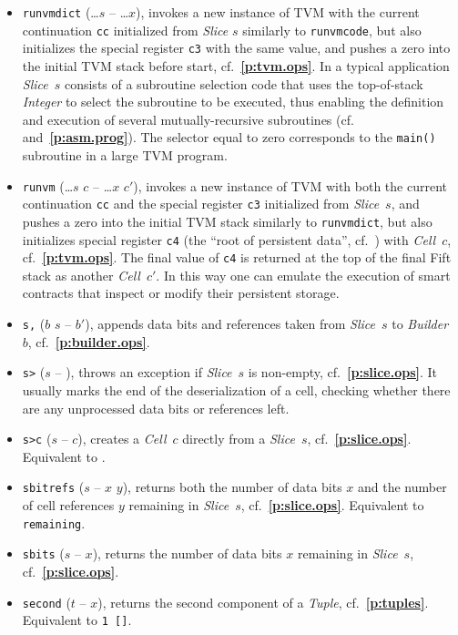 \documentclass[12pt,oneside]{article}
\def\refpoint#1{{\rm\textbf{\ref{#1}}}}
\let\ptref=\refpoint
\begin{document}
\begin{itemize}
\item {\tt runvmdict} (\dots $s$ -- \dots $x$), invokes a new instance of TVM with the current continuation {\tt cc} initialized from {\em Slice\/} $s$ similarly to {\tt runvmcode}, but also initializes the special register {\tt c3} with the same value, and pushes a zero into the initial TVM stack before start, cf.~\ptref{p:tvm.ops}. In a typical application {\em Slice\/}~$s$ consists of a subroutine selection code that uses the top-of-stack {\em Integer\/} to select the subroutine to be executed, thus enabling the definition and execution of several mutually-recursive subroutines (cf.~\cite[4.6]{TVM} and~\ptref{p:asm.prog}). The selector equal to zero corresponds to the {\tt main()} subroutine in a large TVM program.
\item {\tt runvm} (\dots $s$ $c$ -- \dots $x$ $c'$), invokes a new instance of TVM with both the current continuation {\tt cc} and the special register {\tt c3} initialized from {\em Slice\/}~$s$, and pushes a zero into the initial TVM stack similarly to {\tt runvmdict}, but also initializes special register {\tt c4} (the ``root of persistent data'', cf.~\cite[1.4]{TVM}) with {\em Cell\/}~$c$, cf.~\ptref{p:tvm.ops}. The final value of {\tt c4} is returned at the top of the final Fift stack as another {\em Cell\/}~$c'$. In this way one can emulate the execution of smart contracts that inspect or modify their persistent storage.
\item {\tt s,} ($b$ $s$ -- $b'$), appends data bits and references taken from {\em Slice}~$s$ to {\em Builder}~$b$, cf.~\ptref{p:builder.ops}.
\item {\tt s>} ($s$ -- ), throws an exception if {\em Slice\/}~$s$ is non-empty, cf.~\ptref{p:slice.ops}. It usually marks the end of the deserialization of a cell, checking whether there are any unprocessed data bits or references left.
\item {\tt s>c} ($s$ -- $c$), creates a {\em Cell}~$c$ directly from a {\em Slice}~$s$, cf.~\ptref{p:slice.ops}. Equivalent to {\tt <b swap s, b>}.
\item {\tt sbitrefs} ($s$ -- $x$ $y$), returns both the number of data bits $x$ and the number of cell references $y$ remaining in {\em Slice}~$s$, cf.~\ptref{p:slice.ops}. Equivalent to {\tt remaining}.
\item {\tt sbits} ($s$ -- $x$), returns the number of data bits $x$ remaining in {\em Slice}~$s$, cf.~\ptref{p:slice.ops}.
\item {\tt second} ($t$ -- $x$), returns the second component of a {\em Tuple}, cf.~\ptref{p:tuples}. Equivalent to {\tt 1 []}.

\end{itemize}
\end{document}
